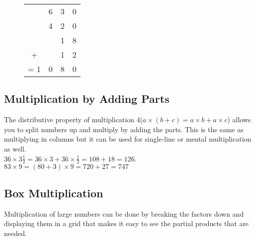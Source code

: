 \documentclass{article}
\begin{document}
\begin{spacing}{1.25}
\begin{figure}[ht]
\begin{minipage}[ht]{0.5\linewidth} \centering 
{}
\end{minipage}
\begin{minipage}[ht]{0.5\linewidth} \centering 
\begin{center}
\begin{tabular}{c@{\,}c@{\,}c@{\,}c@{\,}}
 &6&3&0\\
 &4&2&0\\
 & &1&8\\
+& &1&2\\
\hline
= 1&0&8&0\\
\end{tabular}
\end{center}
\end{minipage}
\end{figure}

\subsection*{Multiplication by Adding Parts}

The distributive property of multiplication 4($a \times (b + c) = a \times b + a \times c$) allows you to split numbers up and  multiply by adding the parts. This is the same as multiplying in columns but it can be used for single-line or mental multiplication as well.\\

$36 \times 3 \frac{1}{2} = 36 \times 3 + 36 \times \frac{1}{2} = 108 + 18 = 126$.\\

$83 \times 9 = (80 + 3) \times 9 = 720 + 27 = 747$

\subsection*{Box Multiplication}
Multiplication of large numbers can be done by breaking the factors down and displaying them in a grid that makes it easy to see the partial products that are needed.\\


\end{spacing}
\end{document}
